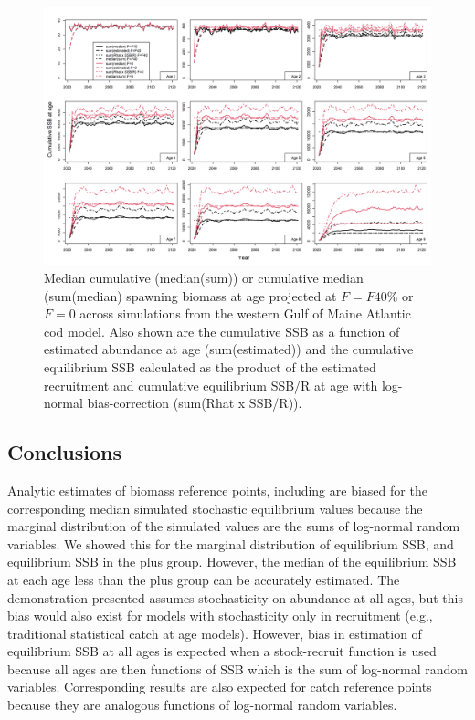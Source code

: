 \documentclass[
]{article}
\begin{document}
\begin{landscape}
\begin{figure}

{\centering \includegraphics[width=1\linewidth]{compare_cumulative_SSBAA_F40_at_age} 

}

\caption{Median cumulative (median(sum)) or cumulative median (sum(median) spawning biomass at age projected at $F = F40\%$ or $F=0$ across simulations from the western Gulf of Maine Atlantic cod model. Also shown are the cumulative SSB as a function of estimated abundance at age (sum(estimated)) and the cumulative equilibrium SSB calculated as the product of the estimated recruitment and cumulative equilibrium SSB/R at age with log-normal bias-correction (sum(Rhat x SSB/R)).}\label{fig:cumssbaa}
\end{figure}
\end{landscape}

\hypertarget{conclusions}{%
\subsection*{Conclusions}\label{conclusions}}

Analytic estimates of biomass reference points, including are biased for the corresponding median simulated stochastic equilibrium values because the marginal distribution of the simulated values are the sums of log-normal random variables. We showed this for the marginal distribution of equilibrium SSB, and equilibrium SSB in the plus group. However, the median of the equilibrium SSB at each age less than the plus group can be accurately estimated. The demonstration presented assumes stochasticity on abundance at all ages, but this bias would also exist for models with stochasticity only in recruitment (e.g., traditional statistical catch at age models). However, bias in estimation of equilibrium SSB at all ages is expected when a stock-recruit function is used because all ages are then functions of SSB which is the sum of log-normal random variables. Corresponding results are also expected for catch reference points because they are analogous functions of log-normal random variables.
\end{document}

